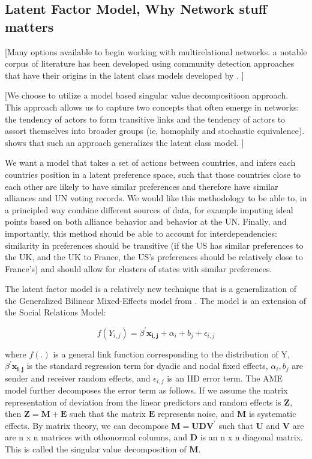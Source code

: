 \subsection{Latent Factor Model, Why Network stuff matters}

[Many options available to begin working with multirelational networks. a notable corpus of literature has been developed using community detection approaches that have their origins in the latent class models developed by \citet{nowicki:snijders:2001}. ]

[We choose to utilize a model based singular value decompositioon approach. This approach allows us to capture two concepts that often emerge in networks: the tendency of actors to form transitive links and the tendency of actors to assort themselves into broader groups (ie, homophily and stochastic equivalence). \citet{hoff:2007} shows that such an approach generalizes  the latent class model. ]

We want a model that takes a set of actions between countries, and infers each countries position in a latent preference space, such that those countries close to each other are likely to have similar preferences and therefore have similar alliances and UN voting records. We would like this methodology to be able to, in a principled way combine different sources of data, for example imputing ideal points based on both alliance behavior and behavior at the UN. Finally, and importantly, this method should be able to account for interdependencies: similarity in preferences should be transitive (if the US has similar preferences to the UK, and the UK to France, the US's preferences should be relatively close to France's) and should allow for clusters of states with similar preferences.

The latent factor model is a relatively new technique that is a generalization of the Generalized Bilinear Mixed-Effects model from \citet{hoff:2005}. The model is an extension of the Social Relations Model: 

\begin{equation}
	f(Y_{i,j}) =  \beta^{'}\mathbf{x_{i,j}} + \alpha_{i} + b_{j} + \epsilon_{i,j}
\end{equation}

where $f(.)$ is a general link function corresponding to the distribution of Y, $\beta^{'}\mathbf{x_{i,j}}$ is the standard regression term for dyadic and nodal fixed effects,  $\alpha_{i}, b_{j}$ are sender and receiver random effects, and $\epsilon_{i,j}$ is an IID error term. The AME model further decomposes the  error term as follows. If we assume the matrix representation of deviation from the linear predictors and random effects is $\mathbf{Z}$, then $\mathbf{Z} = \mathbf{M} + \mathbf{E}$ such that the matrix $\mathbf{E}$ represents noise, and $\mathbf{M}$ is systematic effects. By matrix theory, we can decompose $\mathbf{M} = \mathbf{UDV^{'}}$ such that $\mathbf{U}$ and $\mathbf{V}$ are are n x n matrices with othonormal columns, and $\mathbf{D}$ is an n x n diagonal matrix. This is called the singular value decomposition of $\mathbf{M}$. 

